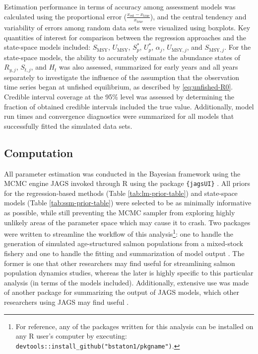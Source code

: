 \documentclass[12pt,]{book}
\let\rmarkdownfootnote\footnote%
\def\footnote{\protect\rmarkdownfootnote}
\theoremstyle{definition}
\theoremstyle{definition}
\theoremstyle{definition}
\theoremstyle{remark}
\begin{document}
Estimation performance in terms of accuracy among assessment models was
calculated using the proportional error
(\(\frac{x_{\text{est}} - x_{\text{true}}}{x_{\text{true}}}\)), and the
central tendency and variability of errors among random data sets were
visualized using boxplots. Key quantities of interest for comparison
between the regression approaches and the state-space models included:
\(S_{\text{MSY}}\), \(U_{\text{MSY}}\), \(S^*_p\), \(U^*_p\),
\(\alpha_j\), \(U_{\text{MSY},j}\), and \(S_{\text{MSY},j}\). For the
state-space models, the ability to accurately estimate the abundance
states of \(R_{y,j}\), \(S_{t,j}\), and \(H_{t}\) was also assessed,
summarized for early years and all years separately to investigate the
influence of the assumption that the observation time series began at
unfished equilibrium, as described by \eqref{eq:unfished-R0}. Credible
interval coverage at the 95\% level was assessed by determining the
fraction of obtained credible intervals included the true value.
Additionally, model run times and convergence diagnostics were
summarized for all models that successfully fitted the simulated data
sets.

\subsection{Computation}\label{computation}

\noindent
All parameter estimation was conducted in the Bayesian framework using
the MCMC engine JAGS \citep{plummer-2017} invoked through R
\citep{r-cite} using the package \texttt{\{jagsUI\}} \citep{r-jagsUI}.
All priors for the regression-based methods (Table
\ref{tab:lm-prior-table}) and state-space models (Table
\ref{tab:ssm-prior-table}) were selected to be as minimally informative
as possible, while still preventing the MCMC sampler from exploring
highly unlikely areas of the parameter space which may cause it to
crash. Two packages were written to streamline the workflow of this
analysis\footnote{For reference, any of the packages written for this
  analysis can be installed on any R user's computer by executing:
  \texttt{devtools::install\_github("bstaton1/pkgname")}.}: one to
handle the generation of simulated age-structured salmon populations
from a mixed-stock fishery \citep[\texttt{\{SimSR\}};][]{r-SimSR} and
one to handle the fitting and summarization of model output
\citep[\texttt{\{FitSR\}};][]{r-FitSR}. The former is one that other
researchers may find useful for streamlining salmon population dynamics
studies, whereas the later is highly specific to this particular
analysis (in terms of the models included). Additionally, extensive use
was made of another package for summarizing the output of JAGS models,
which other researchers using JAGS may find useful
\citep[\texttt{\{codaTools\}};][]{r-codaTools}.
\end{document}
